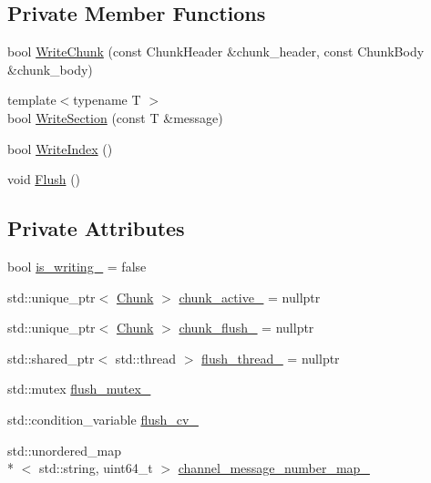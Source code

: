 \subsection*{Private Member Functions}
\begin{DoxyCompactItemize}
\item 
bool \hyperlink{classapollo_1_1cyber_1_1record_1_1RecordFileWriter_a4b89c153e22c9f7304fe902d1f54df7d}{Write\-Chunk} (const Chunk\-Header \&chunk\-\_\-header, const Chunk\-Body \&chunk\-\_\-body)
\item 
{\footnotesize template$<$typename T $>$ }\\bool \hyperlink{classapollo_1_1cyber_1_1record_1_1RecordFileWriter_a1d5ab4981b71ae0ee82edfed00ac3aab}{Write\-Section} (const T \&message)
\item 
bool \hyperlink{classapollo_1_1cyber_1_1record_1_1RecordFileWriter_ad219175016997c7bc038117723460341}{Write\-Index} ()
\item 
void \hyperlink{classapollo_1_1cyber_1_1record_1_1RecordFileWriter_add82a05fc9a0d63e6ff91120bdfe3947}{Flush} ()
\end{DoxyCompactItemize}
\subsection*{Private Attributes}
\begin{DoxyCompactItemize}
\item 
bool \hyperlink{classapollo_1_1cyber_1_1record_1_1RecordFileWriter_a3594172acf9d83c7276cd387c4f62b7f}{is\-\_\-writing\-\_\-} = false
\item 
std\-::unique\-\_\-ptr$<$ \hyperlink{structapollo_1_1cyber_1_1record_1_1Chunk}{Chunk} $>$ \hyperlink{classapollo_1_1cyber_1_1record_1_1RecordFileWriter_a70eb9d380cca0c9e9e277c9903d338fc}{chunk\-\_\-active\-\_\-} = nullptr
\item 
std\-::unique\-\_\-ptr$<$ \hyperlink{structapollo_1_1cyber_1_1record_1_1Chunk}{Chunk} $>$ \hyperlink{classapollo_1_1cyber_1_1record_1_1RecordFileWriter_a4e115eea29809bec0a280350e3193969}{chunk\-\_\-flush\-\_\-} = nullptr
\item 
std\-::shared\-\_\-ptr$<$ std\-::thread $>$ \hyperlink{classapollo_1_1cyber_1_1record_1_1RecordFileWriter_aa8f0f4f7fe1d8da5b01a5079a16452a9}{flush\-\_\-thread\-\_\-} = nullptr
\item 
std\-::mutex \hyperlink{classapollo_1_1cyber_1_1record_1_1RecordFileWriter_a6e1e0d90c3ce75d4c19a74bec5e82ef5}{flush\-\_\-mutex\-\_\-}
\item 
std\-::condition\-\_\-variable \hyperlink{classapollo_1_1cyber_1_1record_1_1RecordFileWriter_a60b937f5a912b7f1b6dd16b7ee67a249}{flush\-\_\-cv\-\_\-}
\item 
std\-::unordered\-\_\-map\\*
$<$ std\-::string, uint64\-\_\-t $>$ \hyperlink{classapollo_1_1cyber_1_1record_1_1RecordFileWriter_a88068ed84f3d00bfa066b921ad48948c}{channel\-\_\-message\-\_\-number\-\_\-map\-\_\-}
\end{DoxyCompactItemize}
